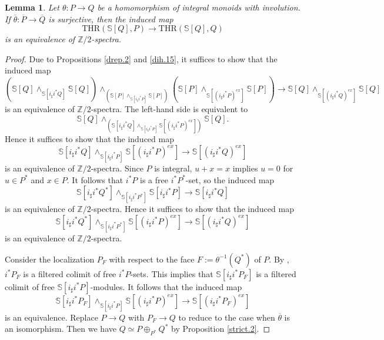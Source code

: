 \documentclass[10pt]{amsart}
\newtheorem{lem}[thm]{Lemma}
\theoremstyle{definition}
\theoremstyle{remark}
\numberwithin{equation}{section}
\newcommand{\Sphere}{\mathbb{S}}
\newcommand{\Z}{\mathbb{Z}}
\newcommand{\ol}{\overline}
\newcommand{\THR}{\mathrm{THR}}
\newcommand{\Ztwo}{{\mathbb{Z}/2}}
\begin{document}
\begin{lem}
\label{strict.3}
Let $\theta\colon P\to Q$ be a homomorphism of integral monoids with involution.
If $\ol{\theta}\colon \ol{P}\to \ol{Q}$ is surjective,
then the induced map
\[
\THR(\Sphere[Q],P)
\to
\THR(\Sphere[Q],Q)
\]
is an equivalence of $\Ztwo$-spectra.
\end{lem}
\begin{proof}
Due to Propositions \ref{drep.2} and \ref{dih.15},
it suffices to show that the induced map
\[
(\Sphere[Q] \wedge_{\Sphere[i_\sharp i^*Q]} \Sphere[Q])
\wedge_{(\Sphere[P] \wedge_{\Sphere[i_\sharp i^*P]} \Sphere[P])}
(\Sphere[P] \wedge_{\Sphere[(i_\sharp i^*P)^{ex}]} \Sphere[P])
\to
\Sphere[Q] \wedge_{\Sphere[(i_\sharp i^*Q)^{ex}]} \Sphere[Q]
\]
is an equivalence of $\Ztwo$-spectra.
The left-hand side is equivalent to
\[
\Sphere[Q]\wedge_{(\Sphere[i_\sharp i^*Q]\wedge_{\Sphere[i_\sharp i^*P]}\Sphere[(i_\sharp i^*P)^{ex}])} \Sphere[Q].
\]
Hence it suffices to show that the induced map
\[
\Sphere[i_\sharp i^*Q]\wedge_{\Sphere[i_\sharp i^*P]}\Sphere[(i_\sharp i^*P)^{ex}]
\to
\Sphere[(i_\sharp i^*Q)^{ex}]
\]
is an equivalence of $\Ztwo$-spectra.
Since $P$ is integral,
$u+x=x$ implies $u=0$ for $u\in P^*$ and $x\in P$.
It follows that
$i^*P$ is a free $i^*P^*$-set,
so the induced map
\[
\Sphere[i_\sharp i^* Q^*]
\wedge_{\Sphere[i_\sharp i^* P^*]}
\Sphere[i_\sharp i^* P]
\to
\Sphere[i_\sharp i^*Q]
\]
is an equivalence of $\Z/2$-spectra.
Hence it suffices to show that the induced map
\begin{equation}
\label{strict.3.1}
\Sphere[i_\sharp i^*Q^*]\wedge_{\Sphere[i_\sharp i^*P^*]}\Sphere[(i_\sharp i^*P)^{ex}]
\to
\Sphere[(i_\sharp i^*Q)^{ex}]
\end{equation}
is an equivalence of $\Ztwo$-spectra.

Consider the localization $P_F$ with respect to the face $F:=\theta^{-1}(Q^*)$ of $P$.
By \cite[Theorem I.4.5.7, Proposition I.4.6.3(3), Remark I.4.6.6]{Ogu},
$i^*P_F$ is a filtered colimit of free $i^*P$-sets.
This implies that $\Sphere[i_\sharp i^*P_F]$ is a filtered colimit of free $\Sphere[i_\sharp i^*P]$-modules.
It follows that the induced map
\[
\Sphere[i_\sharp i^*P_F]\wedge_{\Sphere[i_\sharp i^*P]}\Sphere[(i_\sharp i^*P)^{ex}]
\to
\Sphere[(i_\sharp i^*P_F)^{ex}]
\]
is an equivalence.
Replace $P\to Q$ with $P_F\to Q$ to reduce to the case when $\ol{\theta}$ is an isomorphism.
Then we have $Q\simeq P\oplus_{P^*} Q^*$ by Proposition \ref{strict.2}.


\end{proof}
\end{document}
